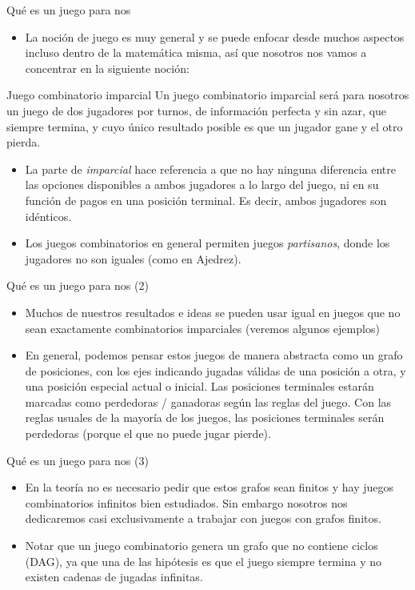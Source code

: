 \documentclass{beamer}
\begin{document}
\begin{frame}{Qué es un juego para nos}
  \begin{itemize}
  \item La noción de juego es muy general y se puede enfocar desde muchos aspectos incluso dentro de la matemática misma, así que nosotros nos vamos a concentrar en la siguiente noción:
  \end{itemize}
  \begin{block}{Juego combinatorio imparcial}
   Un juego combinatorio imparcial será para nosotros un juego de dos jugadores por turnos, de información perfecta y sin azar, que siempre termina, y cuyo único resultado posible es que un jugador gane y el otro pierda.
  \end{block}
  \begin{itemize}
  \item La parte de \textit{imparcial} hace referencia a que no hay ninguna diferencia entre las opciones disponibles a ambos
  jugadores a lo largo del juego, ni en su función de pagos en una posición terminal. Es decir, ambos jugadores son idénticos.
  \item Los juegos combinatorios en general permiten juegos \textit{partisanos}, donde los jugadores no son iguales (como en Ajedrez).
  \end{itemize}
\end{frame}

\begin{frame}{Qué es un juego para nos (2)}
  \begin{itemize}
  \item Muchos de nuestros resultados e ideas se pueden usar igual en juegos que no sean exactamente combinatorios imparciales (veremos algunos ejemplos)
  \item En general, podemos pensar estos juegos de manera abstracta como un grafo de posiciones, con los ejes indicando jugadas válidas
  de una posición a otra, y una posición especial actual o inicial. Las posiciones terminales estarán marcadas como perdedoras / ganadoras según las reglas del juego. Con las
  reglas usuales de la mayoría de los juegos, las posiciones terminales serán perdedoras (porque el que no puede jugar pierde).
  \end{itemize}
\end{frame}

\begin{frame}{Qué es un juego para nos (3)}
  \begin{itemize}
  \item En la teoría no es necesario pedir que estos grafos sean finitos y hay juegos combinatorios infinitos bien estudiados. Sin
  embargo nosotros nos dedicaremos casi exclusivamente a trabajar con juegos con grafos finitos.
  \item Notar que un juego combinatorio genera un grafo que no contiene ciclos (DAG), ya que una de las hipótesis es que el juego
  siempre termina y no existen cadenas de jugadas infinitas.
  \end{itemize}
\end{frame}
\end{document}
